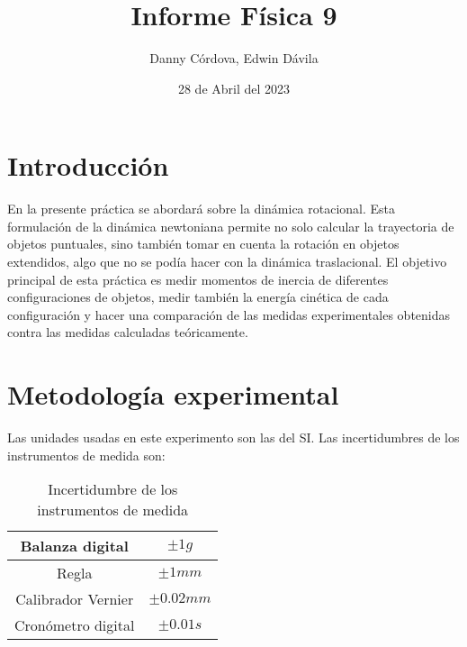 \documentclass[a4paper]{article}
\title{Informe Física 9}
\author{Danny Córdova, Edwin Dávila}
\date{28 de Abril del 2023}
\begin{document}
\maketitle

\section{Introducción}

En la presente práctica se abordará sobre la dinámica rotacional. Esta formulación de la dinámica newtoniana permite no solo calcular la trayectoria de objetos puntuales, sino también tomar en cuenta la rotación en objetos extendidos, algo que no se podía hacer con la dinámica traslacional. El objetivo principal de esta práctica es medir momentos de inercia de diferentes configuraciones de objetos, medir también la energía cinética de cada configuración y hacer una comparación de las medidas experimentales obtenidas contra las medidas calculadas teóricamente.

\section{Metodología experimental}

Las unidades usadas en este experimento son las del SI. Las incertidumbres de los instrumentos de medida son:

\begin{table}[H]
    \centering
    \begin{tabular}{|c|c|}
    \hline
        Balanza digital & $\pm1 g$ \\ \hline
        Regla  & $\pm 1 mm$ \\ \hline
        Calibrador Vernier  & $\pm 0.02 mm$ \\ \hline
        Cronómetro digital & $\pm 0.01 s$ \\ \hline
    \end{tabular}
    \caption{Incertidumbre de los instrumentos de medida}
    \label{Incertidumbre de los instrumentos de medida}
\end{table}
\end{document}
